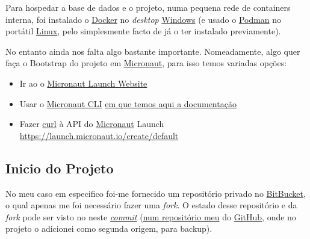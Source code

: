 Para hospedar a base de dados e o projeto, numa pequena rede de containers interna, foi instalado o \href{https://www.docker.com/}{Docker} no \textit{desktop} \href{https://www.microsoft.com/pt-pt/software-download/windows10}{Windows} (e usado o \href{https://podman.io/}{Podman} no portátil \href{https://archlinux.org/download/}{Linux}, pelo simplesmente facto de já o ter instalado previamente).

No entanto ainda nos falta algo bastante importante. Nomeadamente, algo quer faça o Bootstrap do projeto em \href{https://micronaut.io/}{Micronaut}, para isso temos variadas opções:

\begin{itemize}
  \item Ir ao o \href{https://micronaut.io/launch}{Micronaut Launch Website}
  \item Usar o \href{https://micronaut.io/download/}{Micronaut CLI} \href{https://micronaut-projects.github.io/micronaut-starter/latest/guide/index.html}{em que temos aqui a documentação}
  \item Fazer \href{https://curl.se/}{curl} à API do \href{https://micronaut.io/}{Micronaut} Launch \href{https://launch.micronaut.io/create/default/com.optiply.project.webshop?lang=JAVA&build=GRADLE&test=JUNIT&javaVersion=JDK_17&features=jackson-databind&features=kubernetes-reactor-client&features=properties&features=flyway&features=jdbc-hikari&features=jooq&features=postgres&features=r2dbc&features=testcontainers&features=lombok&features=mockito&features=openrewrite&features=asciidoctor&features=logback&features=reactor&features=security-jwt&features=problem-json&features=jackson-xml}{https://launch.micronaut.io/create/default}
\end{itemize}

\subsection{Inicio do Projeto}

No meu caso em especifico foi-me fornecido um repositório privado no \href{https://bitbucket.org/}{BitBucket}, o qual apenas me foi necessário fazer uma \textit{fork}. O estado desse repositório e da \textit{fork} pode ser visto no neste \href{https://github.com/CatKinKitKat/MicronautJooqPostgresREST/tree/07d359ce933dde634f176dc95bf5ac1b3e4bc93d}{\textit{commit}} (\href{https://github.com/CatKinKitKat/MicronautJooqPostgresREST}{num repositório meu} do \href{https://github.com/}{GitHub}, onde no projeto o adicionei como segunda origem, para backup).

